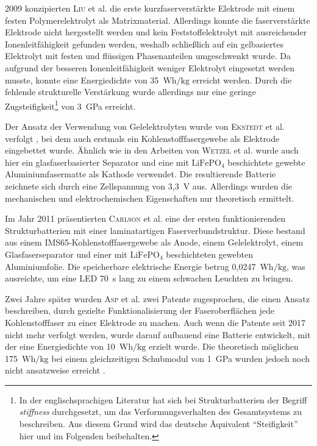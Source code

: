 2009 konzipierten \textsc{Liu} et al. \cite{Liu2009} die erste kurzfaserverstärkte Elektrode mit einem festen Polymerelektrolyt als Matrixmaterial. Allerdings konnte die faserverstärkte Elektrode nicht hergestellt werden und kein Feststoffelektrolyt mit ausreichender Ionenleitfähigkeit gefunden werden, weshalb schließlich auf ein gelbasiertes Elektrolyt mit festen und flüssigen Phasenanteilen umgeschwenkt wurde. Da aufgrund der besseren Ionenleitfähigkeit weniger Elektrolyt eingesetzt werden musste, konnte eine Energiedichte von 35~$\si{\watt \hour \per \kg}$ erreicht werden. Durch die fehlende strukturelle Verstärkung wurde allerdings nur eine geringe Zugsteifigkeit\footnote{In der englischsprachigen Literatur hat sich bei Strukturbatterien der Begriff \textit{stiffness} durchgesetzt, um das Verformungsverhalten des Gesamtsystems zu beschreiben. Aus diesem Grund wird das deutsche Äquivalent "`Steifigkeit"' hier und im Folgenden beibehalten.} von 3~GPa erreicht.

Der Ansatz der Verwendung von Gelelektrolyten wurde von \textsc{Ekstedt} et al. verfolgt \cite{Ekstedt2010}, bei dem auch erstmals ein Kohlenstofffasergewebe als Elektrode eingebettet wurde. Ähnlich wie in den Arbeiten von \textsc{Wetzel} et al. wurde auch hier ein glasfaserbasierter Separator und eine mit $\text{LiFePO}_\text{4}$ beschichtete gewebte Aluminiumfasermatte als Kathode verwendet. Die resultierende Batterie zeichnete sich durch eine Zellspannung von 3,3~V aus. Allerdings wurden die mechanischen und elektrochemischen Eigenschaften nur theoretisch ermittelt.

Im Jahr 2011 präsentierten \textsc{Carlson} et al. \cite{Carlson2011} eine der ersten funktionierenden Strukturbatterien mit einer laminatartigen Faserverbundstruktur. Diese bestand aus einem IMS65-Kohlenstofffasergewebe als Anode, einem Gelelektrolyt, einem Glasfaserseparator und einer mit $\text{LiFePO}_\text{4}$ beschichteten gewebten Aluminiumfolie. Die speicherbare elektrische Energie betrug 0,0247~$\si{\watt \hour \per \kg}$, was ausreichte, um eine LED 70~s lang zu einem schwachen Leuchten zu bringen.

Zwei Jahre später wurden \textsc{Asp} et al. \cite{Asp2013US,Asp2013CN} zwei Patente zugesprochen, die einen Ansatz beschreiben, durch gezielte Funktionalisierung der Faseroberflächen jede Kohlenstofffaser zu einer Elektrode zu machen. Auch wenn die Patente seit 2017 nicht mehr verfolgt werden, wurde darauf aufbauend eine Batterie entwickelt, mit der eine Energiedichte von 10~$\si{\watt \hour \per \kg}$ erzielt wurde. Die theoretisch möglichen 175~$\si{\watt \hour \per \kg}$ bei einem gleichzeitigen Schubmodul von 1~GPa wurden jedoch noch nicht ansatzweise erreicht \cite{Leijonmarck2013, Carlson2013}.

